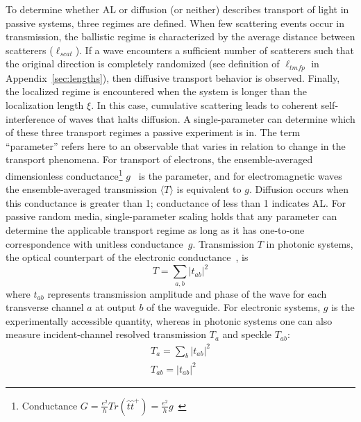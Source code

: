 To determine whether AL or diffusion (or neither) describes transport of light in passive systems, three regimes are defined. When few scattering events occur in transmission, the ballistic regime is characterized by the average distance between scatterers ($\ell_{scat}$). If a wave encounters a sufficient number of scatterers such that the original direction is completely randomized (see definition of $\ell_{tmfp}$ in Appendix~\ref{sec:lengths}), then diffusive transport behavior is observed. Finally, the localized regime is encountered when the system is longer than the localization length $\xi$. In this case, cumulative scattering leads to coherent self-interference of waves that halts diffusion. A single-parameter can determine which of these three transport regimes a passive experiment is in. The term ``parameter'' refers here to an observable that varies in relation to change in the transport phenomena. For transport of electrons, the ensemble-averaged dimensionless conductance\footnote{Conductance $G=\frac{e^2}{h}Tr(\hat{t}\hat{t}^+)=\frac{e^2}{h}g$~\cite{1988_Stone}} $g$~\cite{1979_Anderson} is the parameter, and for electromagnetic waves the ensemble-averaged transmission $\langle T\rangle$ is equivalent to $g$.  Diffusion occurs when this conductance is greater than 1; conductance of less than 1 indicates AL. For passive random media, single-parameter scaling holds that any parameter can determine the applicable transport regime as long as it has one-to-one correspondence with unitless conductance~$g$. Transmission $T$ in photonic systems, the optical counterpart of the electronic conductance~\cite{1988_Stone,1981_Fisher,1981_Soukoulis}, is
\begin{equation}
 T = \sum_{a,b} |t_{ab}|^2
\end{equation}
where $t_{ab}$ represents transmission amplitude and phase of the wave for each transverse channel $a$ at output $b$ of the waveguide. For electronic systems, $g$ is the experimentally accessible quantity, whereas in photonic systems one can also measure incident-channel resolved transmission $T_{a}$ and speckle $T_{ab}$: 
\begin{equation}
\begin{gathered}
 T_a = \sum_b |t_{ab}|^2 \\
 T_{ab} = |t_{ab}|^2
\end{gathered}
\end{equation}

